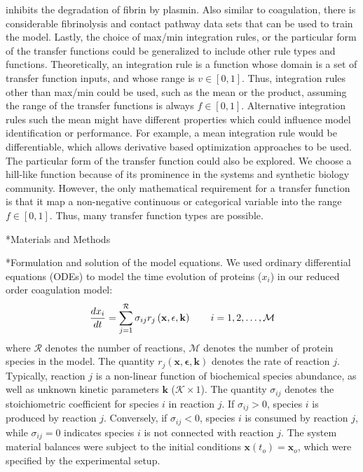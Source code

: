\documentclass[12pt]{article}
\makeatletter
\renewcommand\subsection{\@startsection
	{subsection}{2}{0mm}
	{-0.05in}
	{-0.5\baselineskip}
	{\normalfont\normalsize\bfseries}}
\renewcommand\section{\@startsection
	{subsection}{2}{0mm}
	{-0.2in}
	{0.05\baselineskip}
	{\normalfont\large\bfseries}}
\makeatother
\begin{document}
inhibits the degradation of fibrin by plasmin. Also similar to coagulation, there is considerable fibrinolysis and contact pathway data sets that can be used to train the model.
Lastly, the choice of max/min integration rules, or the particular form of the transfer functions could be generalized to include other rule types and functions. 
Theoretically, an integration rule is a function whose domain is a set of transfer function inputs, and whose range is $v\in[0,1]$.
Thus, integration rules other than max/min could be used, such as the mean or the product, assuming the range of the transfer functions is always $f\in[0,1]$.
Alternative integration rules such the mean might have different properties which could influence model identification or performance. 
For example, a mean integration rule would be differentiable, which allows derivative based optimization approaches to be used. 
The particular form of the transfer function could also be explored. We choose a hill-like function because of its 
prominence in the systems and synthetic biology community. 
However, the only mathematical requirement for a transfer function is that it map a non-negative continuous or categorical variable into the 
range $f\in[0,1]$. Thus, many transfer function types are possible.

\clearpage

\section*{Materials and Methods}

\subsection*{Formulation and solution of the model equations.}
We used ordinary differential equations (ODEs) to model the time evolution of proteins ($x_{i}$) in our reduced order coagulation model:
\begin{equation}
	\frac{dx_{i}}{dt}  =  \sum_{j = 1}^{\mathcal{R}}\sigma_{ij}r_{j}\left(\mathbf{x},\mathbf{\epsilon},\mathbf{k}\right)\qquad{i=1,2,\hdots,\mathcal{M}}\\
\end{equation}
where $\mathcal{R}$ denotes the number of reactions, $\mathcal{M}$ denotes the number of protein species in the model. 
The quantity $r_{j}\left(\mathbf{x},\mathbf{\epsilon},\mathbf{k}\right)$ denotes the rate of reaction $j$. 
Typically, reaction $j$ is a non-linear function of biochemical species abundance, as well as unknown kinetic parameters $\mathbf{k}$ ($\mathcal{K}\times{1}$). 
The quantity $\sigma_{ij}$ denotes the stoichiometric coefficient for species $i$ in reaction $j$. 
If $\sigma_{ij}>0$, species $i$ is produced by reaction $j$. 
Conversely, if $\sigma_{ij}<0$, species $i$ is consumed by reaction $j$, while $\sigma_{ij} = 0$ indicates species $i$ is not connected with reaction $j$. 
The system material balances were subject to the initial conditions $\mathbf{x}\left(t_{o}\right) = \mathbf{x}_{o}$, which were specified by the experimental setup.
\end{document}
